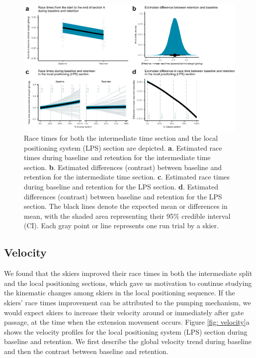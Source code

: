 \documentclass{article}
\begin{document}
\begin{figure}[H]
\centering
\includegraphics{figurer/figure_racetime_2.pdf}
\caption{Race times for both the intermediate time section and the local positioning system (LPS) section are depicted. \textbf{a}. Estimated race times during baseline and retention for the intermediate time section. \textbf{b}. Estimated differences (contrast) between baseline and retention for the intermediate time section. \textbf{c}. Estimated race times during baseline and retention for the LPS section. \textbf{d}. Estimated differences (contrast) between baseline and retention for the LPS section. The black lines denote the expected mean or differences in mean, with the shaded area representing their 95\% credible interval (CI). Each gray point or line represents one run trial by a skier.}\label{fig: racetimes}
\end{figure}

\subsection{Velocity}
We found that the skiers improved their race times in both the intermediate split and the local positioning sections, which gave us motivation to continue studying the kinematic changes among skiers in the local positioning sequence. If the skiers' race times improvement can be attributed to the pumping mechanism, we would expect skiers to increase their velocity around or immediately after gate passage, at the time when the extension movement occurs. Figure \ref{fig: velocity}a shows the velocity profiles for the local positioning system (LPS) section during baseline and retention. We first describe the global velocity trend during baseline and then the contrast between baseline and retention. 
\end{document}
